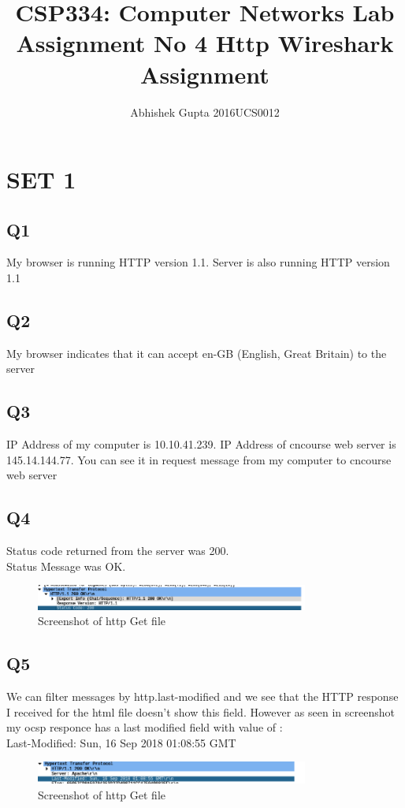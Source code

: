 \documentclass{article}
\title{CSP334: Computer Networks \linebreak
Lab Assignment No 4\linebreak
Http Wireshark Assignment}
\author{Abhishek Gupta  2016UCS0012}
\begin{document}
\maketitle

\section{SET 1}

\subsection{Q1}
My browser is running HTTP version 1.1. Server is also running HTTP version 1.1\\
\subsection{Q2}
My browser indicates that it can accept en-GB (English, Great Britain) to the server\\
\subsection{Q3}
IP Address of my computer is 10.10.41.239. IP Address of cncourse web server is 145.14.144.77. You can see it in request message from my computer to cncourse web server\\
\subsection{Q4}
Status code returned from the server was 200.\\
Status Message was OK.\\
  \begin{figure}[H]
 \centering
 \includegraphics[width=0.8\textwidth]{../Set1/q4/a.png}
 \caption{\label{fig:PING}Screenshot of http Get file}
 \end{figure}
\subsection{Q5}
We can filter messages by http.last-modified and we see that the HTTP response I received for the html file doesn’t show this field. However as seen in screenshot my ocsp responce has a last modified field with value of :\\
Last-Modified: Sun, 16 Sep 2018 01:08:55 GMT\\
  \begin{figure}[H]
 \centering
 \includegraphics[width=0.8\textwidth]{../Set1/q5/a.png}
 \caption{\label{fig:PING}Screenshot of http Get file}
 \end{figure}
\end{document}
